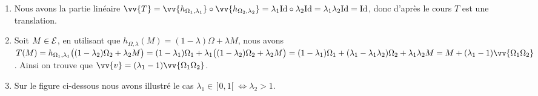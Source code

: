 \documentclass[a4paper,12pt,reqno]{amsart}
\begin{document}
\begin{solution}
  \begin{enumerate}
    \item Nous avons la partie linéaire $\vv{T}=\vv{h_{\Omega_{1},\lambda_{1}}}\circ \vv{h_{\Omega_{2},\lambda_{2}}}=\lambda_{1}\id \circ \lambda_{2}\id = \lambda_{1}\lambda_{2}\id = \id$, donc d'après le cours $T$ est une translation.
    \item Soit $M \in \mathcal{E}$, en utilisant que $h_{\Omega,\lambda}(M) = (1-\lambda)\Omega + \lambda M$, nous avons $T(M) = h_{\Omega_{1},\lambda_{1}}\big((1-\lambda_{2})\Omega_{2} + \lambda_{2}M\big)=(1-\lambda_{1})\Omega_{1} + \lambda_{1}\big((1-\lambda_{2})\Omega_{2} + \lambda_{2}M\big)= (1-\lambda_{1})\Omega_{1} + (\lambda_{1}-\lambda_{1}\lambda_{2})\Omega_{2} + \lambda_{1}\lambda_{2}M = M + (\lambda_{1}-1)\vv{\Omega_{1}\Omega_{2}}$. Ainsi on trouve que $\vv{v} = (\lambda_{1}-1)\vv{\Omega_{1}\Omega_{2}}$.
    \item Sur le figure ci-dessous nous avons illustré le cas $\lambda_{1} \in\, ]0,1[\;  \Leftrightarrow\lambda_{2} > 1$.
    \begin{center}
      
    \end{center}
  \end{enumerate}
\end{solution}
\end{document}
